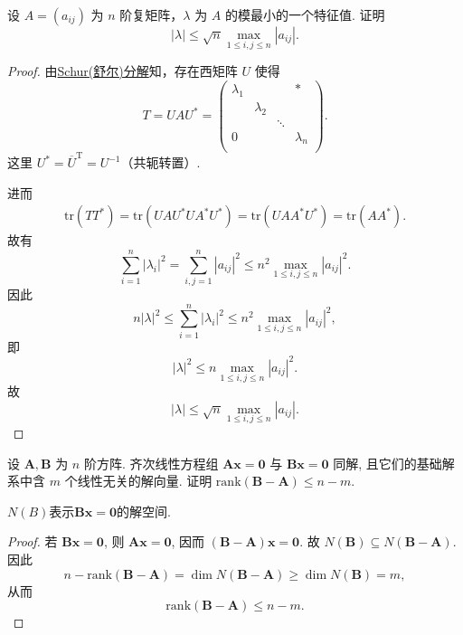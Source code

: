 \documentclass[../../main.tex]{subfiles}%
\begin{document}
\begin{example}
设 \( A = (a_{ij}) \) 为 \( n \) 阶复矩阵，\( \lambda \) 为 \( A \) 的模最小的一个特征值. 证明
\[
|\lambda| \leqslant \sqrt{n} \max_{1 \leqslant i,j \leqslant n} |a_{ij}|.
\]
\end{example}
\begin{proof}

由\hyperref[theorem:Schur(舒尔)定理]{Schur(舒尔)分解}知，存在西矩阵 \( U \) 使得
\[
T = UAU^* = \left( \begin{matrix}
\lambda _1&		&		&		*\\
&		\lambda _2&		&		\\
&		&		\ddots&		\\
0&		&		&		\lambda _n\\
\end{matrix} \right) .
\]
这里 \( U^* = \overline{U}^\mathrm{T} =U^{-1}\)（共轭转置）.

进而
\begin{align*}
\mathrm{tr}(TT^*)= \mathrm{tr}(UAU^*UA^*U^*)= \mathrm{tr}(UAA^*U^*) = \mathrm{tr}(AA^*).
\end{align*}
故有
\[
\sum_{i=1}^n |\lambda_i|^2 = \sum_{i,j=1}^n |a_{ij}|^2 \leqslant n^2 \max_{1 \leqslant i,j \leqslant n} |a_{ij}|^2.
\]
因此
\[
n|\lambda|^2 \leqslant \sum_{i=1}^n |\lambda_i|^2 \leqslant n^2 \max_{1 \leqslant i,j \leqslant n} |a_{ij}|^2,
\]
即
\[
|\lambda|^2 \leqslant n \max_{1 \leqslant i,j \leqslant n} |a_{ij}|^2.
\]
故
\[
|\lambda| \leqslant \sqrt{n} \max_{1 \leqslant i,j \leqslant n} |a_{ij}|.
\]

\end{proof}

\begin{example}
设 $\boldsymbol{A},\boldsymbol{B}$ 为 $n$ 阶方阵. 齐次线性方程组 $\boldsymbol{A}\boldsymbol{x} = \boldsymbol{0}$ 与 $\boldsymbol{B}\boldsymbol{x} = \boldsymbol{0}$ 同解, 且它们的基础解系中含 $m$ 个线性无关的解向量. 证明 $\mathrm{rank}(\boldsymbol{B} - \boldsymbol{A}) \leqslant n - m$.
\end{example}
\begin{remark}
$N(B)$表示$\boldsymbol{B}\boldsymbol{x} = \boldsymbol{0}$的解空间.
\end{remark}
\begin{proof}

若 $\boldsymbol{B}\boldsymbol{x} = \boldsymbol{0}$, 则 $\boldsymbol{A}\boldsymbol{x} = \boldsymbol{0}$, 因而 $(\boldsymbol{B} - \boldsymbol{A})\boldsymbol{x} = \boldsymbol{0}$. 故 $N(\boldsymbol{B}) \subseteq N(\boldsymbol{B} - \boldsymbol{A})$. 因此
\[
n - \mathrm{rank}(\boldsymbol{B} - \boldsymbol{A}) = \dim N(\boldsymbol{B} - \boldsymbol{A}) \geqslant \dim N(\boldsymbol{B}) = m,
\]
从而
\[
\mathrm{rank}(\boldsymbol{B} - \boldsymbol{A}) \leqslant n - m.
\]

\end{proof}
\end{document}
